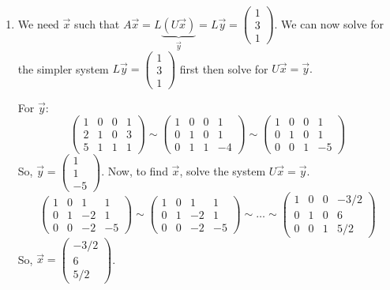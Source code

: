 \begin{enumerate}
\begin{enumerate}
	\item We need \(\vec{x}\) such that \(A\vec{x} = L\underbrace{(U\vec{x})}_{\vec{y}} = L\vec{y} = \begin{pmatrix}1 \\ 3 \\ 1\end{pmatrix}.\) We can now solve
		for the simpler system \(L\vec{y} = \begin{pmatrix}1 \\ 3 \\ 1\end{pmatrix}\) first then solve for \(U \vec{x} = \vec{y}.\)

		For \(\vec{y}\):
			\[\left(\!\!\begin{array}{ccc|c}1 & 0 & 0 & 1 \\ 2 & 1 & 0 & 3 \\ 5 & 1 & 1 & 1\end{array}\!\!\right) 
			  \sim
			  \left(\!\!\begin{array}{ccc|c}1 & 0 & 0 & 1 \\ 0 & 1 & 0 & 1 \\ 0 & 1 & 1 & -4\end{array}\!\!\right)
			  \sim
			  \left(\!\!\begin{array}{ccc|c}1 & 0 & 0 & 1 \\ 0 & 1 & 0 & 1 \\ 0 & 0 & 1 & -5\end{array}\!\!\right)				
			\]
		So, \(\vec{y} = \begin{pmatrix}1 \\ 1 \\ -5\end{pmatrix}\). Now, to find \(\vec{x}\), solve the system \(U\vec{x} = \vec{y}.\)
			\[\left(\!\!\begin{array}{ccc|c}1 & 0 & 1 & 1 \\ 0 & 1 & -2 & 1 \\ 0 & 0 & -2 & -5 \end{array}\!\!\right) 
			  \sim
			   \left(\!\!\begin{array}{ccc|c}1 & 0 & 1 & 1 \\ 0 & 1 & -2 & 1 \\ 0 & 0 & -2 & -5 \end{array}\!\!\right)
			  \sim \dots \sim
			  \left(\!\!\begin{array}{ccc|c}1 & 0 & 0 & -3/2 \\ 0 & 1 & 0 & 6 \\ 0 & 0 & 1 & 5/2 \end{array}\!\!\right)
			\]
		So, \(\vec{x} = \begin{pmatrix}-3/2 \\ 6 \\ 5/2\end{pmatrix}\).
\end{enumerate}
\end{enumerate}

